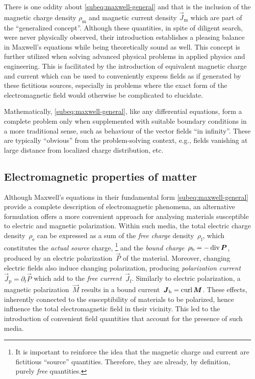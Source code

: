 \documentclass[11pt,a4paper,twoside,openany]{report}
\begin{document}
There is one oddity about \cref{subeq:maxwell-general} and that is the inclusion of the magnetic charge density $\rho_{\mathrm m}$ and magnetic current density $\vec J_{\mathrm m}$ which are part of the \enquote{generalized concept}. Although these quantities, in spite of diligent search, were never physically observed, their introduction establishes a pleasing balance in Maxwell's equations while being theoretically sound as well. This concept is further utilized when solving advanced physical problems in applied physics and engineering. This is facilitated by the introduction of equivalent magnetic charge and current which can be used to conveniently express fields as if generated by these fictitious sources, especially in problems where the exact form of the electromagnetic field would otherwise be complicated to elucidate.

Mathematically, \cref{subeq:maxwell-general}, like any differential equations, form a complete problem only when supplemented with suitable boundary conditions in a more traditional sense, such as behaviour of the vector fields \enquote{in infinity}. These are typically \enquote{obvious} from the problem-solving context, e.g., fields vanishing at large distance from localized charge distribution, etc.

\subsection{Electromagnetic properties of matter}
Although Maxwell's equations in their fundamental form \eqref{subeq:maxwell-general} provide a complete description of electromagnetic phenomena, an alternative formulation offers a more convenient approach for analysing materials susceptible to electric and magnetic polarization. Within such media, the total electric charge density~$\rho_{\mathrm e}$ can be expressed as a sum of the \emph{free charge} density~$\rho_{\mathrm f}$, which constitutes the \emph{actual source} charge,%
    \footnote{It is important to reinforce the idea that the magnetic charge and current are fictitious \enquote{source} quantities. Therefore, they are already, by definition, purely \emph{free} quantities.}
and the \emph{bound charge}~$\rho_{\mathrm b}=-\operatorname{div}\boldsymbol P$, produced by an electric polarization~$\vec P$ of the material. Moreover, changing electric fields also induce changing polarization, producing \emph{polarization current}~$\vec J_{\mathrm p}=\partial_t\vec P$ which add to the \emph{free current}~$\vec J_{\mathrm f}$. Similarly to electric polarization, a magnetic polarization~$\vec M$ results in a bound current~$\boldsymbol J_{\mathrm b}=\operatorname{curl}\boldsymbol M$. These effects, inherently connected to the susceptibility of materials to be polarized, hence influence the total electromagnetic field in their vicinity. This led to the introduction of convenient field quantities that account for the presence of such media.
\end{document}
